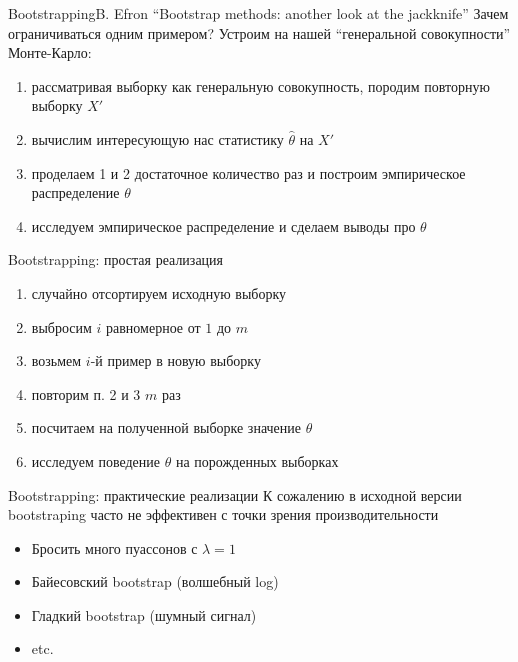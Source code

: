 \documentclass[14pt, fleqn, xcolor={dvipsnames, table}]{beamer}
\begin{document}
\begin{frame}{Bootstrapping}{B. Efron ``Bootstrap methods: another look at the jackknife''}
Зачем ограничиваться одним примером? Устроим на нашей ``генеральной совокупности'' Монте-Карло:
\begin{enumerate}
  \item рассматривая выборку как генеральную совокупность, породим повторную выборку $X'$
  \item вычислим интересующую нас статистику $\hat{\theta}$ на $X'$
  \item проделаем 1 и 2 достаточное количество раз и построим эмпирическое распределение $\theta$
  \item исследуем эмпирическое распределение и сделаем выводы про $\theta$
\end{enumerate}
\end{frame}

\begin{frame}{Bootstrapping: простая реализация}
\begin{enumerate}
  \item случайно отсортируем исходную выборку
  \item выбросим $i$ равномерное от $1$ до $m$
  \item возьмем $i$-й пример в новую выборку
  \item повторим п. 2 и 3 $m$ раз
  \item посчитаем на полученной выборке значение $\theta$
  \item исследуем поведение $\theta$ на порожденных выборках
\end{enumerate} 
\end{frame}

\begin{frame}{Bootstrapping: практические реализации}
К сожалению в исходной версии bootstraping часто не эффективен с точки зрения производительности 
\begin{itemize}
  \item Бросить много пуассонов с $\lambda = 1$
  \item Байесовский bootstrap (волшебный log)
  \item Гладкий bootstrap (шумный сигнал)
  \item etc.
\end{itemize}
\end{frame}
\end{document}
